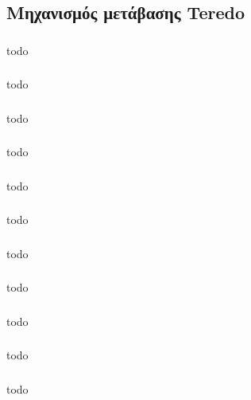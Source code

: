 \documentclass[a4paper, 12pt]{article}
\begin{document}
	\subsection{Μηχανισμός μετάβασης Teredo}

		\subsubsection{}
			todo

		\subsubsection{}
			todo

		\subsubsection{}
			todo

		\subsubsection{}
			todo

		\subsubsection{}
			todo

		\subsubsection{}
			todo

		\subsubsection{}
			todo

		\subsubsection{}
			todo

		\subsubsection{}
			todo

		\subsubsection{}
			todo

		\subsubsection{}
			todo
\end{document}
